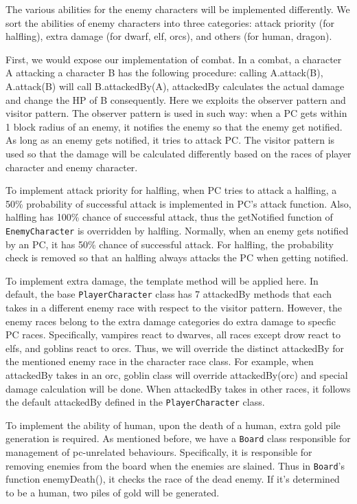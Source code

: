 \documentclass[11pt]{article}
\theoremstyle{plain} \newtheorem{theorem*}{Theorem}[subsection]
\begin{document}
The various abilities for the enemy characters will be implemented differently.
We sort the abilities of enemy characters into three categories: attack
priority (for halfling), extra damage (for dwarf, elf, orcs), and others (for
human, dragon).  

First, we would expose our implementation of combat. In a combat, a character A
attacking a character B has the following procedure: calling A.\textsf{attack}(B),
A.\textsf{attack}(B) will call B.\textsf{attackedBy}(A), \textsf{attackedBy} 
calculates the actual damage and change the HP of B consequently. Here we 
exploits the observer pattern and visitor pattern. The observer pattern is used 
in such way: when a PC gets within 1 block radius of an enemy, it notifies the 
enemy so that the enemy get notified. As long as an enemy gets notified, it 
tries to attack PC. The visitor pattern is used so that the damage will be 
calculated differently based on the races of player character and enemy character. 

To implement attack priority for halfling, when PC tries to attack a halfling,
a 50\% probability of successful attack is implemented in PC’s \textsf{attack} 
function. Also, halfling has 100\% chance of successful attack, thus the 
\textsf{getNotified} function of \texttt{EnemyCharacter} is overridden by halfling. 
Normally, when an enemy gets notified by an PC, it has 50\% chance of successful 
attack. For halfling, the probability check is removed so that an halfling always 
attacks the PC when getting notified. 

To implement extra damage, the template method will be applied here. In
default, the base \texttt{PlayerCharacter} class has 7 \textsf{attackedBy} methods 
that each takes in a different enemy race with respect to the visitor pattern. 
However, the enemy races belong to the extra damage categories do extra damage to
specfic PC races. Specifically, vampires react to dwarves, all races except
drow react to elfs, and goblins react to orcs. Thus, we will override the
distinct \textsf{attackedBy} for the mentioned enemy race in the character race 
class. For example,  when \textsf{attackedBy} takes in an orc, goblin class will 
override \textsf{attackedBy}(orc) and special damage calculation will be done. 
When \textsf{attackedBy} takes in other races, it follows the default 
\textsf{attackedBy} defined in the \texttt{PlayerCharacter} class. 

To implement the ability of human, upon the death of a human, extra gold pile
generation is required. As mentioned before, we have a \texttt{Board} class 
responsible for management of pc-unrelated behaviours. Specifically, it is 
responsible for removing enemies from the board when the enemies are slained. 
Thus in \texttt{Board}’s function \textsf{enemyDeath()}, it checks the race of 
the dead enemy. If it’s determined to be a human, two piles of gold will be 
generated. 
\end{document}
